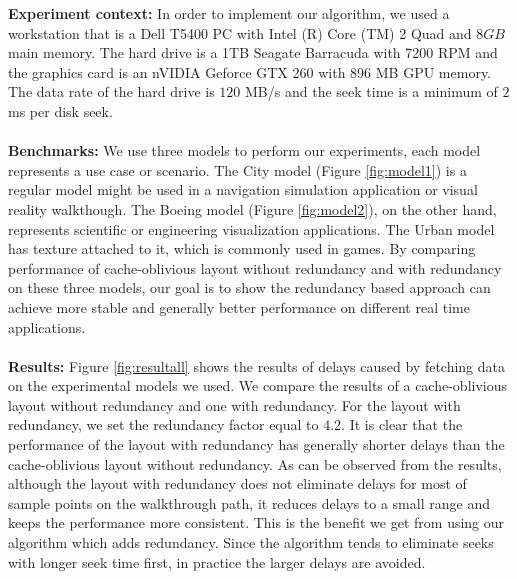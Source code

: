 \documentclass[conference]{acmsiggraph}
\begin{document}
\textbf{Experiment context:}
In order to implement our algorithm, we used a workstation that is a Dell T5400 PC with Intel (R) Core (TM) 2 Quad and $8GB$ main memory. The hard drive is a 1TB Seagate Barracuda with 7200 RPM and the graphics card is an nVIDIA Geforce GTX 260 with 896 MB GPU memory. The data rate of the hard drive is $120$ MB/s and the seek time is a minimum of $2$ ms per disk seek.\\
\\
\textbf{Benchmarks:}
We use three models to perform our experiments, each model represents a use case or scenario. The City model (Figure \ref{fig:model1}) is a regular model might be used in a navigation simulation application or visual reality walkthough. The Boeing model (Figure \ref{fig:model2}), on the other hand, represents scientific or engineering visualization applications. The Urban model has texture attached to it, which is commonly used in games. By comparing performance of cache-oblivious layout without redundancy and with redundancy on these three models, our goal is to show the redundancy based approach can achieve more stable and generally better performance on different real time applications. \\
\\
\textbf{Results:}
Figure \ref{fig:resultall} shows the results of delays caused by fetching data on the experimental models we used. We compare the results of a cache-oblivious layout without redundancy and one with redundancy. For the layout with redundancy, we set the redundancy factor equal to 4.2. It is clear that the performance of the layout with redundancy has generally shorter delays than the cache-oblivious layout without redundancy. As can be observed from the results, although the layout with redundancy does not eliminate delays for most of sample points on the walkthrough path, it reduces delays to a small range and keeps the performance more consistent. This is the benefit we get from using our algorithm which adds redundancy. Since the algorithm tends to eliminate seeks with longer seek time first, in practice the larger delays are avoided.\\
\\
\end{document}
